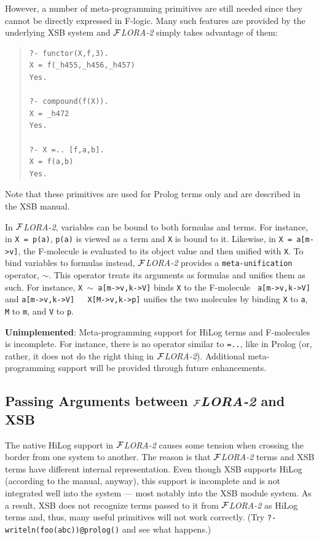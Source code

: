 \documentclass[11pt]{article}
\newcommand{\FLORA}{{\mbox{${\cal F}${\small\it LORA}\rm\emph{-2}}}\xspace}
\newcommand{\fl}{\mbox{F-logic}\xspace}
\begin{document}
However, a number of meta-programming primitives are still needed
since they cannot be directly expressed in \fl. Many such features are
provided by the underlying XSB system and \FLORA simply takes advantage of
them: 
\begin{quote}
\begin{verbatim}
?- functor(X,f,3).
X = f(_h455,_h456,_h457)
Yes.

?- compound(f(X)).
X = _h472
Yes.

?- X =.. [f,a,b].
X = f(a,b)
Yes.
\end{verbatim}
\end{quote}
Note that these primitives are used for Prolog terms only and
are described in the XSB manual.

\index{$\sim$}
In \FLORA, variables can be bound to both formulas and terms. For instance,
in {\tt X = p(a)}, {\tt p(a)} is viewed as a term and {\tt X} is bound to
it. Likewise, in {\tt X = a[m->v]}, the F-molecule is evaluated to its
object value and then unified with {\tt X}. To bind variables to formulas
instead, \FLORA provides a {\tt meta-unification} operator, $\sim$.  This
operator treats its arguments as formulas and unifies them as such. For
instance, {\tt X $\sim$ a[m->v,k->V]} binds {\tt X} to the F-molecule {\tt
  a[m->v,k->V]} and {\tt a[m->v,k->V] ~ X[M->v,k->p]} unifies the two
molecules by binding {\tt X} to {\tt a}, {\tt M} to {\tt m}, and {\tt V} to
{\tt p}.

{\bf Unimplemented}: Meta-programming support for HiLog terms and
F-molecules is incomplete. For instance, there is no operator similar to
{\tt =..}, like in Prolog (or, rather, it does not do the right thing in
\FLORA). Additional meta-programming support will be provided through
future enhancements.


\subsection{Passing Arguments between \FLORA and XSB}\label{sec-passing-args}

The native HiLog support in \FLORA causes some tension when crossing the
border from one system to another. The reason is that \FLORA terms and XSB
terms have different internal representation. Even though XSB supports
HiLog (according to the manual, anyway), this support is incomplete and is
not integrated well into the system --- most notably into the XSB module
system. As a result, XSB does not recognize terms passed to it from \FLORA
as HiLog terms and, thus, many useful primitives will not work correctly.
(Try {\tt ?- writeln(foo(abc))@prolog()} and see what happens.)
\end{document}
